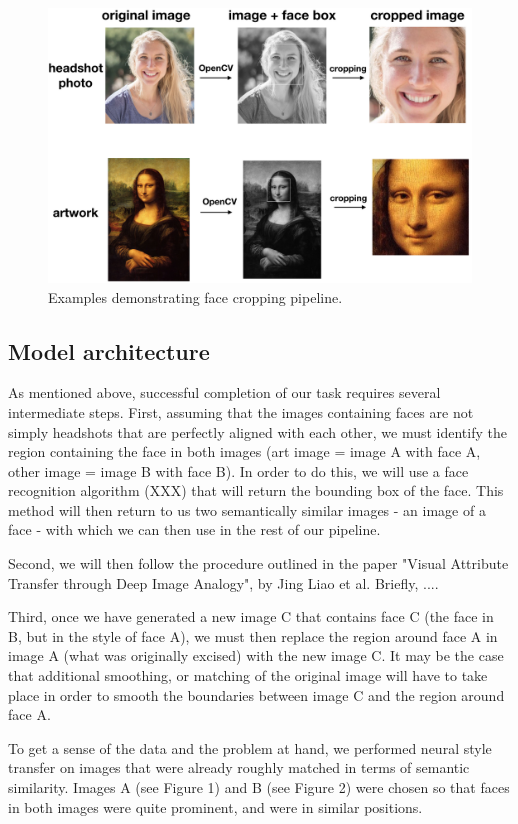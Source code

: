\documentclass{pnastwo2}
\begin{document}
\begin{article}
\begin{figure}
	\begin{center}
		\includegraphics[width=.45\textwidth]{face_crop_figure}
		\caption{Examples demonstrating face cropping pipeline.} \label{fig:face_crop}
	\end{center}
\end{figure} 

\subsection{Model architecture}

As mentioned above, successful completion of our task requires several intermediate steps. First, assuming that the images containing faces are not simply headshots that are perfectly aligned with each other, we must identify the region containing the face in both images (art image = image A with face A, other image = image B with face B). In order to do this, we will use a face recognition algorithm (XXX) that will return the bounding box of the face. This method will then return to us two semantically similar images - an image of a face - with which we can then use in the rest of our pipeline.

Second, we will then follow the procedure outlined in the paper "Visual Attribute Transfer through Deep Image Analogy", by Jing Liao et al. Briefly, .... 

Third, once we have generated a new image C that contains face C (the face in B, but in the style of face A), we must then replace the region around face A in image A (what was originally excised) with the new image C. It may be the case that additional smoothing, or matching of the original image will have to take place in order to smooth the boundaries between image C and the region around face A. 

To get a sense of the data and the problem at hand, we performed neural style transfer on images that were already roughly matched in terms of semantic similarity. Images A (see Figure 1) and B (see Figure 2) were chosen so that faces in both images were quite prominent, and were in similar positions.


\end{article}
\end{document}
